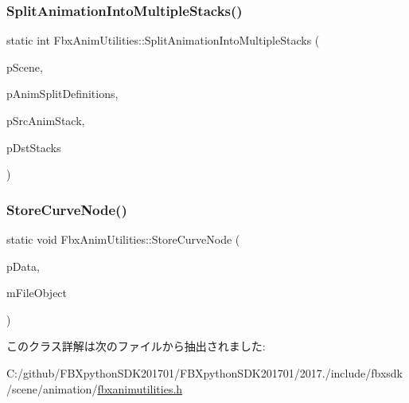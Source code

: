 \subsubsection{\texorpdfstring{Split\+Animation\+Into\+Multiple\+Stacks()}{SplitAnimationIntoMultipleStacks()}}
{\footnotesize\ttfamily static int Fbx\+Anim\+Utilities\+::\+Split\+Animation\+Into\+Multiple\+Stacks (\begin{DoxyParamCaption}\item[{\hyperlink{class_fbx_scene}{Fbx\+Scene} $\ast$}]{p\+Scene,  }\item[{const \hyperlink{class_fbx_array}{Fbx\+Array}$<$ \hyperlink{class_fbx_anim_utilities_1_1_fbx_anim_split_def}{Fbx\+Anim\+Split\+Def} $\ast$$>$ \&}]{p\+Anim\+Split\+Definitions,  }\item[{const \hyperlink{class_fbx_anim_stack}{Fbx\+Anim\+Stack} $\ast$}]{p\+Src\+Anim\+Stack,  }\item[{\hyperlink{class_fbx_array}{Fbx\+Array}$<$ \hyperlink{class_fbx_anim_stack}{Fbx\+Anim\+Stack} $\ast$$>$ \&}]{p\+Dst\+Stacks }\end{DoxyParamCaption})\hspace{0.3cm}{\ttfamily [static]}}

\mbox{\label{class_fbx_anim_utilities_a85a425cdc6787b10cd6c6f05d23e2b51}} 
\subsubsection{\texorpdfstring{Store\+Curve\+Node()}{StoreCurveNode()}}
{\footnotesize\ttfamily static void Fbx\+Anim\+Utilities\+::\+Store\+Curve\+Node (\begin{DoxyParamCaption}\item[{\hyperlink{class_fbx_anim_utilities_1_1_curve_node_intfce}{Curve\+Node\+Intfce} \&}]{p\+Data,  }\item[{\hyperlink{class_fbx_i_o}{Fbx\+IO} $\ast$}]{m\+File\+Object }\end{DoxyParamCaption})\hspace{0.3cm}{\ttfamily [static]}}



このクラス詳解は次のファイルから抽出されました\+:\begin{DoxyCompactItemize}
\item 
C\+:/github/\+F\+B\+Xpython\+S\+D\+K201701/\+F\+B\+Xpython\+S\+D\+K201701/2017./include/fbxsdk/scene/animation/\hyperlink{fbxanimutilities_8h}{fbxanimutilities.\+h}\end{DoxyCompactItemize}
